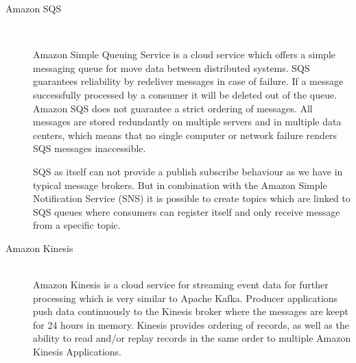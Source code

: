 \begin{description}
    \item [Amazon SQS] \hfill \\
    {
        Amazon Simple Queuing Service is a cloud service which offers a simple messaging queue for
        move data between distributed systems. SQS guarantees reliability
        by redeliver messages in case of failure. If a message successfully
        processed by a consumer it will be deleted out of the queue.  Amazon SQS
        does not guarantee a strict ordering of messages. All messages are
        stored redundantly on multiple servers and in multiple data centers,
        which means that no single computer or network failure
        renders SQS messages inaccessible.\cite{amazonSQS} \cite{amazonSQSFaq} 

        SQS as itself can not provide a publish subscribe behaviour as we
        have in typical message brokers. But in combination with the Amazon
        Simple  Notification Service (SNS) it
        is possible to create topics which are linked to SQS queues where
        consumers can register itself and only receive message from a specific
        topic. \cite{amazonSqsPubSub}
     }
    \item [Amazon Kinesis] \hfill \\
    { 
    Amazon Kinesis is a cloud service for streaming event
    data for further processing which is very similar to Apache Kafka. Producer
    applications push data continuously to the Kinesis broker where the messages
    are keept for 24 hours in memory. Kinesis provides ordering of records, as
    well as the ability to read and/or replay records in the same order to
    multiple Amazon Kinesis Applications.
    \cite{amazonKinesis} \cite{amazonKinesisFAQ} 
    }


\end{description}
